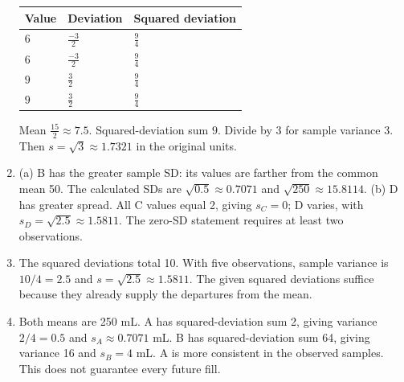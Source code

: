 \begin{enumerate}[label=C\arabic*.,leftmargin=2.5em,itemsep=10pt]
\begin{minipage}{\linewidth}
{\begin{tabularx}{\linewidth}{@{}YYY@{}}
Value & Deviation & Squared deviation\\\midrule
$6$ & $\frac{-3}{2}$ & $\frac{9}{4}$\\
$6$ & $\frac{-3}{2}$ & $\frac{9}{4}$\\
$9$ & $\frac{3}{2}$ & $\frac{9}{4}$\\
$9$ & $\frac{3}{2}$ & $\frac{9}{4}$\\
\bottomrule\end{tabularx}}\par\medskip
Mean $\frac{15}{2}\approx 7.5$. Squared-deviation sum $9$. Divide by 3 for sample variance $3$. Then $s=\sqrt{3}\approx 1.7321$ in the original units.\par\end{minipage}\par\medskip

\item (a) B has the greater sample SD: its values are farther from the common mean 50. The calculated SDs are $\sqrt{0.5}\approx0.7071$ and $\sqrt{250}\approx15.8114$. (b) D has greater spread. All C values equal 2, giving $s_C=0$; D varies, with $s_D=\sqrt{2.5}\approx1.5811$. The zero-SD statement requires at least two observations.
\item The squared deviations total 10. With five observations, sample variance is $10/4=2.5$ and $s=\sqrt{2.5}\approx1.5811$. The given squared deviations suffice because they already supply the departures from the mean.
\item Both means are 250 mL. A has squared-deviation sum 2, giving variance $2/4=0.5$ and $s_A\approx0.7071$ mL. B has squared-deviation sum 64, giving variance 16 and $s_B=4$ mL. A is more consistent in the observed samples. This does not guarantee every future fill.
\end{enumerate}

